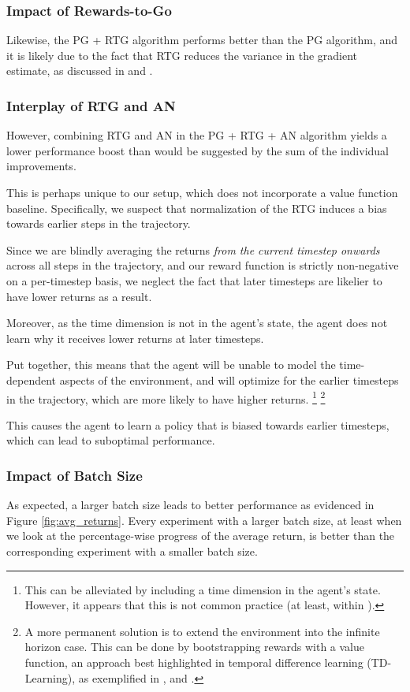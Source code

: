 \documentclass{article} %
\begin{document}
\subsubsection{Impact of Rewards-to-Go}
Likewise, the PG + RTG algorithm performs better than the PG algorithm,
and it is likely due to the fact that RTG reduces the variance in the gradient estimate,
as discussed in \cite{Levine-et-al-2023} and \cite{Week2}.

\subsubsection{Interplay of RTG and AN}
However, combining RTG and AN in the PG + RTG + AN algorithm yields a lower performance boost
than would be suggested by the sum of the individual improvements.

This is perhaps unique to our setup, which does not incorporate a value function baseline.
Specifically, we suspect that normalization of the RTG induces a bias towards earlier steps in the trajectory.

Since we are blindly averaging the returns \textit{from the current timestep onwards} across all steps in the trajectory, 
and our reward function is strictly non-negative on a per-timestep basis,
we neglect the fact that later timesteps are likelier to have lower returns as a result. 

Moreover, as the time dimension is not in the agent's state,
the agent does not learn why it receives lower returns at later timesteps.

Put together, this means that the agent will be unable to model the time-dependent aspects of the environment,
and will optimize for the earlier timesteps in the trajectory, which are more likely to have higher returns.
\footnote{
    This can be alleviated by including a time dimension in the agent's state.
    However, it appears that this is not common practice (at least, within \cite{Towers-et-al-2024}).
}
\footnote{
    A more permanent solution is to extend the environment into the infinite horizon case.
    This can be done by bootstrapping rewards with a value function,
    an approach best highlighted in temporal difference learning (TD-Learning),
    as exemplified in \cite{Sutton-1988}, and \cite{Schulman-et-al-2018}.
}

This causes the agent to learn a policy that is biased towards earlier timesteps,
which can lead to suboptimal performance.

\subsubsection{Impact of Batch Size}
As expected, a larger batch size leads to better performance as evidenced in Figure \ref{fig:avg_returns}.
Every experiment with a larger batch size, at least when we look at the percentage-wise progress of the average return,
is better than the corresponding experiment with a smaller batch size.
\end{document}
